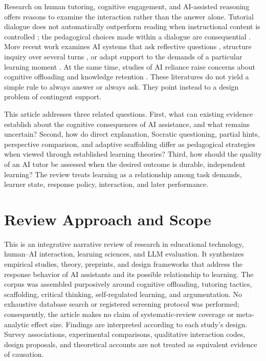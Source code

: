 \documentclass[11pt,a4paper]{article}
\begin{document}
Research on human tutoring, cognitive engagement, and AI-assisted reasoning offers reasons to examine the interaction rather than the answer alone. Tutorial dialogue does not automatically outperform reading when instructional content is controlled \cite{P14}; the pedagogical choices made within a dialogue are consequential \cite{P07}. More recent work examines AI systems that ask reflective questions \cite{P46}, structure inquiry over several turns \cite{P25}, or adapt support to the demands of a particular learning moment \cite{P52}. At the same time, studies of AI reliance raise concerns about cognitive offloading and knowledge retention \cite{P12,P38,P43}. These literatures do not yield a simple rule to always answer or always ask. They point instead to a design problem of contingent support.

This article addresses three related questions. First, what can existing evidence establish about the cognitive consequences of AI assistance, and what remains uncertain? Second, how do direct explanation, Socratic questioning, partial hints, perspective comparison, and adaptive scaffolding differ as pedagogical strategies when viewed through established learning theories? Third, how should the quality of an AI tutor be assessed when the desired outcome is durable, independent learning? The review treats learning as a relationship among task demands, learner state, response policy, interaction, and later performance.

\section{Review Approach and Scope}
This is an integrative narrative review of research in educational technology, human--AI interaction, learning sciences, and LLM evaluation. It synthesizes empirical studies, theory, preprints, and design frameworks that address the response behavior of AI assistants and its possible relationship to learning. The corpus was assembled purposively around cognitive offloading, tutoring tactics, scaffolding, critical thinking, self-regulated learning, and argumentation. No exhaustive database search or registered screening protocol was performed; consequently, the article makes no claim of systematic-review coverage or meta-analytic effect size. Findings are interpreted according to each study's design. Survey associations, experimental comparisons, qualitative interaction codes, design proposals, and theoretical accounts are not treated as equivalent evidence of causation.
\end{document}
